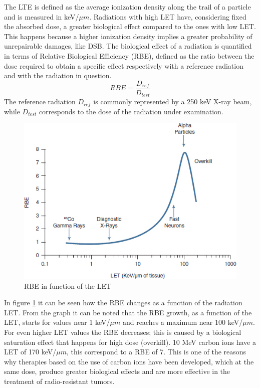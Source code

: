 \noindent The LTE is defined as the average ionization density along the trail of a particle and is measured in keV/$\mu m$.
Radiations with high LET have, considering fixed the absorbed dose, a greater biological effect compared to the ones with low LET.
This happens because a higher ionization density implies a greater probability of unrepairable damages, like DSB.
The biological effect of a radiation is quantified in terms of Relative Biological Efficiency (RBE), defined as the ratio between the dose required to obtain a specific effect respectively with a reference radiation and with the radiation in question.
\begin{equation}\label{eq:rbe}
	RBE=\frac{D_{ref}}{D_{test}}
\end{equation}
\noindent The reference radiation $D_{ref}$ is commonly represented by a 250 keV X-ray beam, while $D_{test}$ corresponds to the dose of the radiation under examination.
\begin{figure}[H]
	\centering
	\includegraphics[width=0.7\linewidth]{IMG/ch1/RBE}
	\caption{RBE in function of the LET}
	\label{fig:rbe}
\end{figure}
\noindent In figure \ref{fig:rbe} it can be seen how the RBE changes as a function of the radiation LET. From the graph it can be noted that the RBE growth, as a function of the LET, starts for values near 1 keV/$\mu m$ and reaches a maximum near 100 keV/$\mu m$. For even higher LET values the RBE decreases; this is caused by a biological saturation effect that happens for high dose (overkill). 
10 MeV carbon ions have a LET of 170 keV/$\mu m$, this correspond to a RBE of 7. This is one of the reasons why therapies based on the use of carbon ions have been developed, which at the same dose, produce greater biological effects and are more effective in the treatment of radio-resistant tumors.


